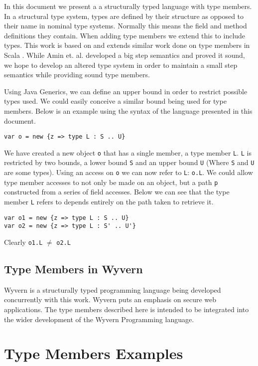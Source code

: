 \documentclass{llncs}
\begin{document}
In this document we present a a structurally typed language with type 
members. In a structural type system, types are defined by their structure 
as opposed to their name in nominal type systems. Normally this means the 
field and method definitions they contain. When adding type members 
we extend this to include types. This work is based on and extends 
similar work done on type members in Scala \cite{Amin:2012}.
While Amin et. al.\cite{Amin:2014} developed a big step semantics and 
proved it sound, we hope to develop an altered type system in order to maintain 
a small step semantics while providing sound type members. 

Using Java Generics, we can define an upper bound in order to restrict 
possible types used. We could easily conceive a similar bound being 
used for type members. Below is an example using the syntax of the language 
presented in this document.
\begin{lstlisting}[mathescape, style=custom_lang]
var o = new {z => type L : S .. U}
\end{lstlisting}
We have created a new object \texttt{o} that has a single member, a type member 
\texttt{L}. \texttt{L} is restricted by two bounds, a lower bound \texttt{S} 
and an upper bound \texttt{U} (Where \texttt{S} and \texttt{U} are some types). 
Using an access on \texttt{o} we can now refer to 
\texttt{L}: \texttt{o.L}.
We could allow type member accesses to not only be made on  
an object, but a path \texttt{p} constructed from a series of field accesses.
Below we can see that the type member \texttt{L} refers to 
depends entirely on the path taken to retrieve it.
\begin{lstlisting}[mathescape, style=custom_lang]
var o1 = new {z => type L : S .. U}
var o2 = new {z => type L : S' .. U'}
\end{lstlisting}
Clearly \texttt{o1.L} $\neq$ \texttt{o2.L}


\subsection{Type Members in Wyvern}
Wyvern is a structurally typed programming language being 
developed concurrently with this work. Wyvern puts an emphasis 
on secure web applications. The type members described here 
is intended to be integrated into the wider development of the 
Wyvern Programming language.




\section{Type Members Examples}
\end{document}
